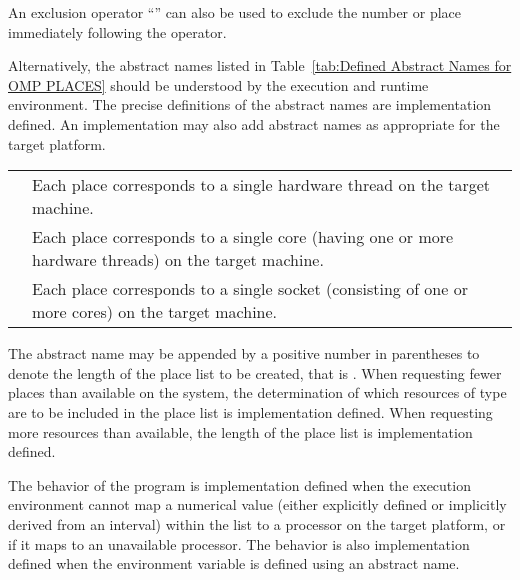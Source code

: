 An exclusion operator ``\code{!}'' can also be used to exclude the number 
or place immediately following the operator.

Alternatively, the abstract names listed in
Table~\ref{tab:Defined Abstract Names for OMP PLACES} should be understood
by the execution and runtime environment. The precise definitions of the
abstract names are implementation defined. An implementation may also add
abstract names as appropriate for the target platform.

\nolinenumbers
\renewcommand{\arraystretch}{1.5}
\tablelasttail{\hline}
\begin{supertabular}{p{1.5in} p{3.5in}}
{} & Each place corresponds to a single hardware 
                    thread on the target machine.\\
{}   & Each place corresponds to a single core (having 
                    one or more hardware threads) on the target machine.\\
{} & Each place corresponds to a single socket (consisting 
                    of one or more cores) on the target machine.\\
\end{supertabular}

\linenumbers

The abstract name may be appended by a positive number in parentheses 
to denote the length of the place list to be created, that is 
. When requesting fewer places than 
available on the system, the determination of which resources of type 
 are to be included in the place list is implementation 
defined. When requesting more resources than available, the length of the 
place list is implementation defined.

The behavior of the program is implementation defined when the execution 
environment cannot map a numerical value (either explicitly defined or 
implicitly derived from an interval) within the  list to 
a processor on the target platform, or if it maps to an unavailable processor. 
The behavior is also implementation defined when the  
environment variable is defined using an abstract name.

